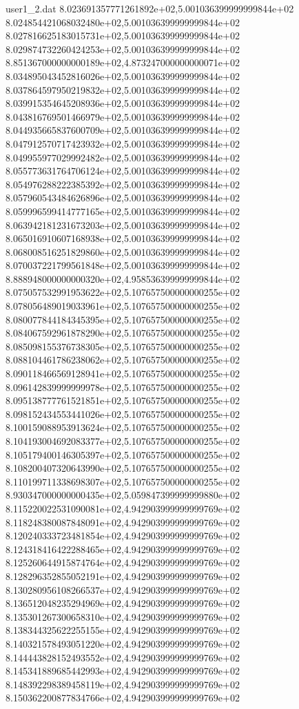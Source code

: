 \begin{filecontents}{user1_2.dat}
8.023691357771261892e+02,5.001036399999999844e+02
8.024854421068032480e+02,5.001036399999999844e+02
8.027816625183015731e+02,5.001036399999999844e+02
8.029874732260424253e+02,5.001036399999999844e+02
8.851367000000000189e+02,4.873247000000000071e+02
8.034895043452816026e+02,5.001036399999999844e+02
8.037864597950219832e+02,5.001036399999999844e+02
8.039915354645208936e+02,5.001036399999999844e+02
8.043816769501466979e+02,5.001036399999999844e+02
8.044935665837600709e+02,5.001036399999999844e+02
8.047912570717423932e+02,5.001036399999999844e+02
8.049955977029992482e+02,5.001036399999999844e+02
8.055773631764706124e+02,5.001036399999999844e+02
8.054976288222385392e+02,5.001036399999999844e+02
8.057960543484626896e+02,5.001036399999999844e+02
8.059996599414777165e+02,5.001036399999999844e+02
8.063942181231673203e+02,5.001036399999999844e+02
8.065016910607168938e+02,5.001036399999999844e+02
8.068008516251829860e+02,5.001036399999999844e+02
8.070037221799561848e+02,5.001036399999999844e+02
8.888948000000000320e+02,4.958536399999999844e+02
8.075057532991953622e+02,5.107657500000000255e+02
8.078056489019033961e+02,5.107657500000000255e+02
8.080077844184345395e+02,5.107657500000000255e+02
8.084067592961878290e+02,5.107657500000000255e+02
8.085098155376738305e+02,5.107657500000000255e+02
8.088104461786238062e+02,5.107657500000000255e+02
8.090118466569128941e+02,5.107657500000000255e+02
8.096142839999999978e+02,5.107657500000000255e+02
8.095138777761521851e+02,5.107657500000000255e+02
8.098152434553441026e+02,5.107657500000000255e+02
8.100159088953913624e+02,5.107657500000000255e+02
8.104193004692083377e+02,5.107657500000000255e+02
8.105179400146305397e+02,5.107657500000000255e+02
8.108200407320643990e+02,5.107657500000000255e+02
8.110199711338698307e+02,5.107657500000000255e+02
8.930347000000000435e+02,5.059847399999999880e+02
8.115220022531090081e+02,4.942903999999999769e+02
8.118248380087848091e+02,4.942903999999999769e+02
8.120240333723481854e+02,4.942903999999999769e+02
8.124318416422288465e+02,4.942903999999999769e+02
8.125260644915874764e+02,4.942903999999999769e+02
8.128296352855052191e+02,4.942903999999999769e+02
8.130280956108266537e+02,4.942903999999999769e+02
8.136512048235294969e+02,4.942903999999999769e+02
8.135301267300658310e+02,4.942903999999999769e+02
8.138344325622255155e+02,4.942903999999999769e+02
8.140321578493051220e+02,4.942903999999999769e+02
8.144443828152493552e+02,4.942903999999999769e+02
8.145341889685442993e+02,4.942903999999999769e+02
8.148392298389458119e+02,4.942903999999999769e+02
8.150362200877834766e+02,4.942903999999999769e+02

\end{filecontents}
